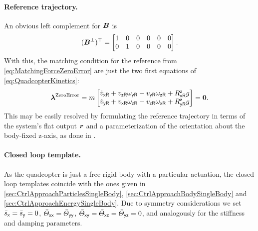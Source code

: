 \paragraph{Reference trajectory.}
An obvious left complement for $\boldsymbol{B}$ is
\begin{align}
 (\boldsymbol{B}^\bot)^\top = \begin{bmatrix} 1 & 0 & 0 & 0 & 0 & 0 \\ 0 & 1 & 0 & 0 & 0 & 0 \end{bmatrix}.
\end{align}
With this, the matching condition for the reference from \eqref{eq:MatchingForceZeroError} are just the two first equations of \eqref{eq:QuadcopterKinetics}:
\begin{align}
 \boldsymbol{\lambda}^{\text{ZeroError}} = m \begin{bmatrix} \dot{v}_{\mathsf{x}\mathsf{R}} + v_{\mathsf{z}\mathsf{R}}\omega_{\mathsf{y}\mathsf{R}}-v_{\mathsf{y}\mathsf{R}}\omega_{\mathsf{z}\mathsf{R}} + R^{\mathsf{z}}_{\mathsf{x}\mathsf{R}}g \\ \dot{v}_{\mathsf{y}\mathsf{R}} + v_{\mathsf{x}\mathsf{R}}\omega_{\mathsf{z}\mathsf{R}}-v_{\mathsf{z}\mathsf{R}}\omega_{\mathsf{x}\mathsf{R}} + R^{\mathsf{z}}_{\mathsf{y}\mathsf{R}} g \end{bmatrix} = \boldsymbol{0}
 .
\end{align}
This may be easily resolved by formulating the reference trajectory in terms of the system's flat output $\boldsymbol{r}$ and a parameterization of the orientation about the body-fixed z-axis, as done in \cite{Konz:QuadrotorMovingFrame}.

\paragraph{Closed loop template.}
As the quadcopter is just a free rigid body with a particular actuation, the closed loop templates coincide with the ones given in \autoref{sec:CtrlApproachParticlesSingleBody}, \autoref{sec:CtrlApproachBodySingleBody} and \autoref{sec:CtrlApproachEnergySingleBody}.
Due to symmetry considerations we set $\bar{s}_{\mathsf{x}} = \bar{s}_{\mathsf{y}} = 0$, $\bar{\varTheta}_{\mathsf{x}\mathsf{x}}=\bar{\varTheta}_{\mathsf{y}\mathsf{y}}$, $\bar{\varTheta}_{\mathsf{x}\mathsf{y}}=\bar{\varTheta}_{\mathsf{x}\mathsf{z}}=\bar{\varTheta}_{\mathsf{y}\mathsf{z}}=0$, and analogously for the stiffness and damping parameters.

